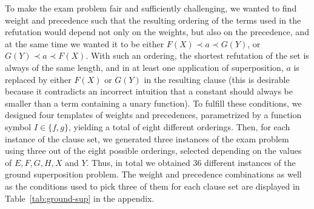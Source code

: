 To make the exam problem fair and sufficiently challenging, we wanted to find
weight and precedence such that the resulting ordering of the terms used
in the refutation would depend not only on the weights, but also on the precedence,
and at the same time we wanted it to be either $F(X) \prec a \prec G(Y)$,
or $G(Y) \prec a \prec F(X)$. With such an ordering,
the shortest refutation of the set is always of the same length, and in
at least one application of superposition, $a$ is replaced by either $F(X)$ or $G(Y)$
in the resulting clause (this is desirable because it contradicts
an incorrect intuition that a constant should always be smaller than a term
containing a unary function).
To fulfill these conditions, we designed four templates of weights and precedences,
parametrized by a function symbol $I \in \{f, g\}$, yielding a total of eight
different orderings.
Then, for each instance of the clause set, we generated three instances of the exam problem
using three out of the eight possible orderings, selected depending on the values
of $E, F, G, H, X$ and $Y$.
Thus, in total we obtained 36 different instances of the ground superposition problem.
The weight and precedence combinations as well as the conditions used to pick
three of them for each clause set are displayed in Table~\ref{tab:ground-sup}
in the appendix.

